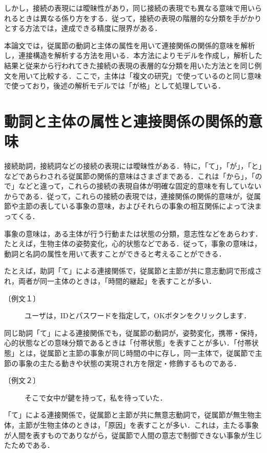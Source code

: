 しかし，接続の表現には曖昧性があり，同じ接続の表現でも異なる意味で用いられるときは異なる係り方をする．従って，接続の表現の階層的な分類を手がかりとする方法では，達成できる精度に限界がある．

本論文では，従属節の動詞と主体の属性を用いて連接関係の関係的意味を解析し，連接構造を解析する方法を用いる．本方法によりモデルを作成し，解析した結果と従来から行われてきた接続の表現の表層的な分類を用いた方法とを同じ例文を用いて比較する．ここで，主体は「複文の研究」\cite{jinta1995}で使っているのと同じ意味で使っており，後述の解析モデルでは「が格」として処理している．

\section{動詞と主体の属性と連接関係の関係的意味}
接続助詞，接続詞などの接続の表現には曖昧性がある．特に，「て」，「が」，「と」などであらわされる従属節の関係的意味はさまざまである．これは「から」，「ので」などと違って，これらの接続の表現自体が明確な固定的意味を有していないからである．従って，これらの接続の表現では，連接関係の関係的意味が，従属節や主節の表している事象の意味，およびそれらの事象の相互関係によって決まってくる．

事象の意味は，ある主体が行う行動または状態の分類，意志性などをあらわす．たとえば，生物主体の姿勢変化，心的状態などである．従って，事象の意味は，動詞と名詞の属性を用いて表すことができると考えることができる．

たとえば，助詞「て」による連接関係で，従属節と主節が共に意志動詞で形成され，両者が同一主体のときは，「時間的継起」を表すことが多い．

\begin{description}
\item[〔例文１〕] ユーザは，IDとパスワードを指定して，OKボタンをクリックします．
\end{description}

同じ助詞「て」による連接関係でも，従属節の動詞が，姿勢変化，携帯・保持，心的状態などの意味分類であるときは「付帯状態」を表すことが多い．「付帯状態」とは，従属節と主節の事象が同じ時間の中に存し，同一主体で，従属節で主節の事象の主たる動きや状態の実現され方を限定・修飾するものである．

\begin{description}
\item[〔例文２〕] そこで女中が鍵を持って，私を待っていた．
\end{description}

「て」による連接関係で，従属節と主節が共に無意志動詞で，従属節が無生物主体，主節が生物主体のときは，「原因」を表すことが多い．これは，主たる事象が人間を表すものでありながら，従属節で人間の意志で制御できない事象が生じたためである．

